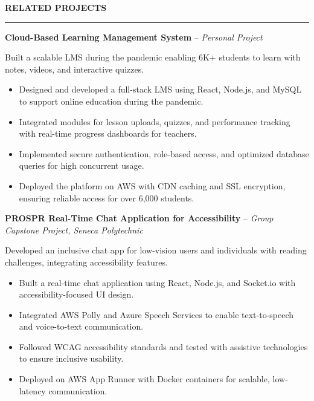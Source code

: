 \documentclass[10pt,letterpaper]{article}
\begin{document}
\vspace{6pt}

\textbf{RELATED PROJECTS}\\[-8pt]
\noindent\rule{\textwidth}{1pt}

\vspace{-2pt}

\textbf{Cloud-Based Learning Management System} -- \emph{Personal Project}

\vspace{-1pt}

Built a scalable LMS during the pandemic enabling 6K+ students to learn with notes, videos, and interactive quizzes.
\vspace{-1pt}
\begin{itemize}
\item Designed and developed a full-stack LMS using React, Node.js, and MySQL to support online education during the pandemic.
\item Integrated modules for lesson uploads, quizzes, and performance tracking with real-time progress dashboards for teachers.
\item Implemented secure authentication, role-based access, and optimized database queries for high concurrent usage.
\item Deployed the platform on AWS with CDN caching and SSL encryption, ensuring reliable access for over 6,000 students.
\end{itemize}

\textbf{PROSPR  Real-Time Chat Application for Accessibility} -- \emph{Group Capstone Project, Seneca Polytechnic}

\vspace{-1pt}

Developed an inclusive chat app for low-vision users and individuals with reading challenges, integrating accessibility features.
\vspace{-1pt}
\begin{itemize}
\item Built a real-time chat application using React, Node.js, and Socket.io with accessibility-focused UI design.
\item Integrated AWS Polly and Azure Speech Services to enable text-to-speech and voice-to-text communication.
\item Followed WCAG accessibility standards and tested with assistive technologies to ensure inclusive usability.
\item Deployed on AWS App Runner with Docker containers for scalable, low-latency communication.
\end{itemize}
\end{document}

